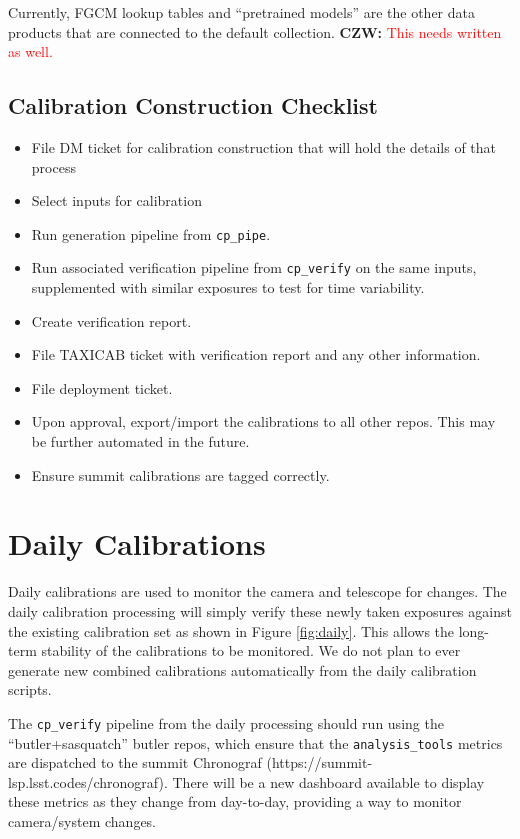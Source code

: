 \documentclass[DM,authoryear,toc]{lsstdoc}
\newcommand{\czw}[1]{
  \textbf{CZW: }\textcolor{red}{#1}
}
\begin{document}
Currently, FGCM lookup tables and ``pretrained models'' are the other data products that are connected to the default collection.  \czw{This needs written as well.}

\subsection{Calibration Construction Checklist}
\begin{itemize}
\item File DM ticket for calibration construction that will hold the details of that process
\item Select inputs for calibration
\item Run generation pipeline from \verb|cp_pipe|.
\item Run associated verification pipeline from \verb|cp_verify| on the same inputs, supplemented with similar exposures to test for time variability.
\item Create verification report.
\item File TAXICAB ticket with verification report and any other information.
\item File deployment ticket.
\item Upon approval, export/import the calibrations to all other repos.  This may be further automated in the future.
\item Ensure summit calibrations are tagged correctly.
\end{itemize}

\section{Daily Calibrations}
Daily calibrations are used to monitor the camera and telescope for changes.
The daily calibration processing will simply verify these newly taken exposures against the existing calibration set as shown in Figure \ref{fig:daily}.
This allows the long-term stability of the calibrations to be monitored.
We do not plan to ever generate new combined calibrations automatically from the daily calibration scripts.

The \verb|cp_verify| pipeline from the daily processing should run using the ``butler+sasquatch'' butler repos, which ensure that the \verb|analysis_tools| metrics are dispatched to the summit Chronograf (https://summit-lsp.lsst.codes/chronograf).
There will be a new dashboard available to display these metrics as they change from day-to-day, providing a way to monitor camera/system changes.
\end{document}
